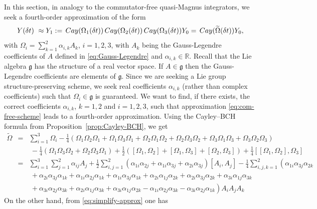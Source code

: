 \documentclass{article}
\newcommand{\Cay}{\,{\rm Cay}}
\newcommand{\R}{\mathbb{R}}
\newcommand{\Om}{\Omega}
\begin{document}
{In this section, in analogy to the commutator-free quasi-Magnus integrators, we seek a fourth-order approximation of the form
%
\begin{equation}
\label{eq:com-free-scheme}
Y(\delta t)\ \approx Y_1 := \Cay(\Om_1(\delta t)) \Cay(\Om_2(\delta t)) \Cay(\Om_3(\delta t))Y_0 = \Cay(\widetilde \Om(\delta t))Y_0,
\end{equation}
%
with $\Om_i = \sum_{k=1}^2 \alpha_{i,k} A_k$, $i=1,2,3$, with $A_k$ being the Gauss-Legendre coefficients of $A$ defined in \eqref{eq:Gauss-Legendre} and $\alpha_{i,k} \in \R$.
Recall that the Lie algebra $\mathfrak g$ has the structure of a real vector space. If $A \in \mathfrak g$ then the Gauss-Legendre coefficients are elements of $\mathfrak g$. Since we are seeking a Lie group structure-preserving scheme, we seek real coefficients $\alpha_{i,k}$ (rather than complex coefficients) such that $\Omega_i \in \mathfrak g$ is guaranteed.
We want to find, if there exists, the correct coefficients $ \alpha_{i,k}$, $k=1,2$ and $i=1,2,3$, such that approximation \eqref{eq:com-free-scheme} leads to a fourth-order approximation.
%
Using the Cayley--BCH formula from Proposition~\ref{prop:Cayley-BCH}, we get
%
\begin{eqnarray}
\label{eq:BCH-develop}
\widetilde \Om &=& \sum_{i=1}^3\Om_i - \frac{1}{4}(\Om_1\Om_2\Om_1 + \Om_1\Om_3\Om_1 + \Om_2\Om_1\Om_2 + \Om_2\Om_3\Om_2 + \Om_3\Om_1\Om_3 + \Om_3\Om_2\Om_3) \nonumber \\
&&~ - \frac{1}{4}(\Om_1\Om_3\Om_2 + \Om_2\Om_3\Om_1) + \frac{1}{2}([\Om_1, \Om_2] + [\Om_1, \Om_3] + [\Om_2, \Om_3]) + \frac{1}{4}[[\Om_1, \Om_2], \Om_3] \nonumber\\
&=& \sum_{i=1}^3\sum_{j=1}^2 \alpha_{ij} A_j + \frac{1}{2}\sum_{i,j=1}^2 (\alpha_{1i}\alpha_{2j} + \alpha_{1i}\alpha_{3j} + \alpha_{2i}\alpha_{3j})[A_i,A_j] - \frac{1}{4}\sum_{i,j,k=1}^2 \left(\alpha_{1i}\alpha_{3j}\alpha_{2k} \right. \nonumber \\
&&~  + \alpha_{2i}\alpha_{3j}\alpha_{1k} + \alpha_{1i}\alpha_{2j}\alpha_{1k} + \alpha_{1i}\alpha_{3j}\alpha_{1k} + \alpha_{2i}\alpha_{1j}\alpha_{2k} + \alpha_{2i}\alpha_{3j}\alpha_{2k} + \alpha_{3i}\alpha_{1j}\alpha_{3k}  \nonumber \\
&&~ + \left. \alpha_{3i}\alpha_{2j}\alpha_{3k} + \alpha_{2i}\alpha_{1j}\alpha_{3k} + \alpha_{3i}\alpha_{1j}\alpha_{2k} - \alpha_{1i}\alpha_{2j}\alpha_{3k} - \alpha_{3i}\alpha_{2j}\alpha_{1k} \right)A_i A_j A_k \nonumber 
\end{eqnarray}
%
On the other hand, from \eqref{eq:simplify-approx} one has
}
\end{document}
